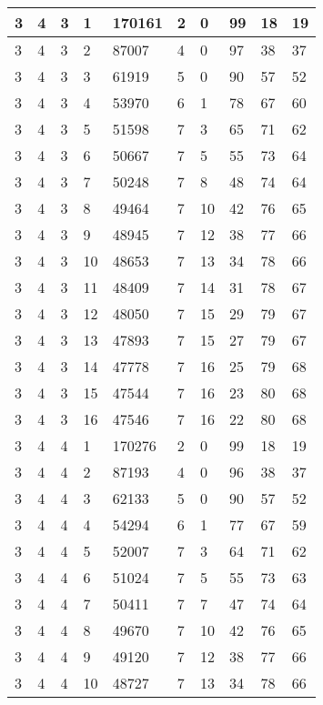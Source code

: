 \begin{table}[!ht]
\begin{tabular}{|l|l|l|l|l|l|l|l|l|l|}
        3 & 4 & 3 & 1 & 170161 & 2 & 0 & 99 & 18 & 19 \\ \hline
        3 & 4 & 3 & 2 & 87007 & 4 & 0 & 97 & 38 & 37 \\ \hline
        3 & 4 & 3 & 3 & 61919 & 5 & 0 & 90 & 57 & 52 \\ \hline
        3 & 4 & 3 & 4 & 53970 & 6 & 1 & 78 & 67 & 60 \\ \hline
        3 & 4 & 3 & 5 & 51598 & 7 & 3 & 65 & 71 & 62 \\ \hline
        3 & 4 & 3 & 6 & 50667 & 7 & 5 & 55 & 73 & 64 \\ \hline
        3 & 4 & 3 & 7 & 50248 & 7 & 8 & 48 & 74 & 64 \\ \hline
        3 & 4 & 3 & 8 & 49464 & 7 & 10 & 42 & 76 & 65 \\ \hline
        3 & 4 & 3 & 9 & 48945 & 7 & 12 & 38 & 77 & 66 \\ \hline
        3 & 4 & 3 & 10 & 48653 & 7 & 13 & 34 & 78 & 66 \\ \hline
        3 & 4 & 3 & 11 & 48409 & 7 & 14 & 31 & 78 & 67 \\ \hline
        3 & 4 & 3 & 12 & 48050 & 7 & 15 & 29 & 79 & 67 \\ \hline
        3 & 4 & 3 & 13 & 47893 & 7 & 15 & 27 & 79 & 67 \\ \hline
        3 & 4 & 3 & 14 & 47778 & 7 & 16 & 25 & 79 & 68 \\ \hline
        3 & 4 & 3 & 15 & 47544 & 7 & 16 & 23 & 80 & 68 \\ \hline
        3 & 4 & 3 & 16 & 47546 & 7 & 16 & 22 & 80 & 68 \\ \hline
        3 & 4 & 4 & 1 & 170276 & 2 & 0 & 99 & 18 & 19 \\ \hline
        3 & 4 & 4 & 2 & 87193 & 4 & 0 & 96 & 38 & 37 \\ \hline
        3 & 4 & 4 & 3 & 62133 & 5 & 0 & 90 & 57 & 52 \\ \hline
        3 & 4 & 4 & 4 & 54294 & 6 & 1 & 77 & 67 & 59 \\ \hline
        3 & 4 & 4 & 5 & 52007 & 7 & 3 & 64 & 71 & 62 \\ \hline
        3 & 4 & 4 & 6 & 51024 & 7 & 5 & 55 & 73 & 63 \\ \hline
        3 & 4 & 4 & 7 & 50411 & 7 & 7 & 47 & 74 & 64 \\ \hline
        3 & 4 & 4 & 8 & 49670 & 7 & 10 & 42 & 76 & 65 \\ \hline
        3 & 4 & 4 & 9 & 49120 & 7 & 12 & 38 & 77 & 66 \\ \hline
        3 & 4 & 4 & 10 & 48727 & 7 & 13 & 34 & 78 & 66 \\ \hline

\end{tabular}
\end{table}
